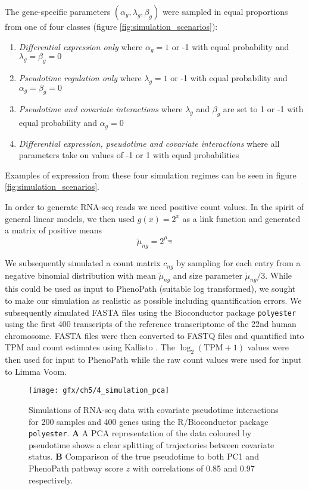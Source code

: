 The gene-specific parameters $(\alpha_g, \lambda_g, \beta_g)$ were sampled in equal proportions from one of four classes (figure \ref{fig:simulation_scenarios}):
\begin{enumerate}
  \item \emph{Differential expression only} where $\alpha_g = 1$ or -1 with equal probability and $\lambda_g = \beta_g = 0$
  \item \emph{Pseudotime regulation only} where $\lambda_g = 1$ or -1 with equal probability and $\alpha_g = \beta_g = 0$
  \item \emph{Pseudotime and covariate interactions} where $\lambda_g$ and $\beta_g$ are set to 1 or -1  with equal probability and $\alpha_g = 0$
  \item \emph{Differential expression, pseudotime and covariate interactions} where all parameters take on values of -1 or 1 with equal probabilities
\end{enumerate}
Examples of expression from these four simulation regimes can be seen in figure \ref{fig:simulation_scenarios}.

In order to generate RNA-seq reads we need positive count values. In the spirit of general linear models, we then used $g(x) = 2^x$ as a link function and generated a matrix of positive means
\begin{equation}
  \tilde{\mu}_{ng} = 2^{\mu_{ng}}
\end{equation}

We subsequently simulated a count matrix $c_{ng}$ by sampling for each entry from a negative binomial distribution with mean $\tilde{\mu}_{ng}$ and size parameter $\tilde{\mu}_{ng} / 3$. While this could be used as input to PhenoPath (suitable log transformed), we sought to make our simulation as realistic as possible including quantification errors. We subsequently simulated FASTA files using the Bioconductor package \texttt{polyester} \cite{Frazee2015-vy} using the first 400 transcripts of the reference transcriptome of the 22nd human chromosome. FASTA files were then converted to FASTQ files
and quantified into TPM and count estimates using Kallisto \cite{Bray2016-uh}. The $\log_2(\text{TPM} + 1)$ values were then used for input to PhenoPath while the raw count values were used for input to Limma Voom.


\begin{figure}
\centering
  \texttt{[image: gfx/ch5/4\_simulation\_pca]}
  \caption{Simulations of RNA-seq data with covariate pseudotime interactions for 200 samples and 400 genes using the R/Bioconductor package \texttt{polyester}. \textbf{A} A PCA representation of the data coloured by pseudotime shows a clear splitting of trajectories between covariate status. \textbf{B} Comparison of the true pseudotime to both PC1 and PhenoPath pathway score $z$ with correlations of 0.85 and 0.97 respectively.
  } \label{fig:simulation_pca}
\end{figure}


